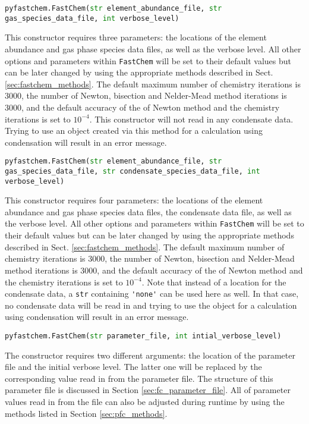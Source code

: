 \documentclass[numbers=noenddot]{aux/fcmanual}
\newcommand{\fc}{\texttt{FastChem}\xspace}
\begin{document}
\lstinline[language=Python, breaklines=true]!pyfastchem.FastChem(str element_abundance_file, str gas_species_data_file, int verbose_level)!
\begin{addmargin}[25pt]{0pt}
	This constructor requires three parameters: the locations of the element abundance and gas phase species data files, as well as the verbose level. All other options and parameters within \fc will be set to their default values but can be later changed by using the appropriate methods described in Sect. \ref{sec:fastchem_methods}. The default maximum number of chemistry iterations is 3000, the number of Newton, bisection and Nelder-Mead method iterations is 3000, and the default accuracy of the of Newton method and the chemistry iterations is set to $10^{-4}$. This constructor will not read in any condensate data. Trying to use an object created via this method for a calculation using condensation will result in an error message.
\end{addmargin}

\bigbreak

\lstinline[language=Python, breaklines=true]!pyfastchem.FastChem(str element_abundance_file, str gas_species_data_file, str condensate_species_data_file, int verbose_level)!
\begin{addmargin}[25pt]{0pt}
	This constructor requires four parameters: the locations of the element abundance and gas phase species data files, the condensate data file, as well as the verbose level. All other options and parameters within \fc will be set to their default values but can be later changed by using the appropriate methods described in Sect. \ref{sec:fastchem_methods}. The default maximum number of chemistry iterations is 3000, the number of Newton, bisection and Nelder-Mead method iterations is 3000, and the default accuracy of the of Newton method and the chemistry iterations is set to $10^{-4}$. Note that instead of a location for the condensate data, a \lstinline!str! containing \lstinline!'none'! can be used here as well. In that case, no condensate data will be read in and trying to use the object for a calculation using condensation will result in an error message.
\end{addmargin}

\bigbreak


\lstinline[language=Python]!pyfastchem.FastChem(str parameter_file, int intial_verbose_level)!
\begin{addmargin}[25pt]{0pt}
	The constructor requires two different arguments: the location of the parameter file and the initial verbose level. The latter one will be replaced by the corresponding value read in from the parameter file. The structure of this parameter file is discussed in Section \ref{sec:fc_parameter_file}. All of parameter values read in from the file can also be adjusted during runtime by using the methods listed in Section \ref{sec:pfc_methods}.
\end{addmargin}
\end{document}

